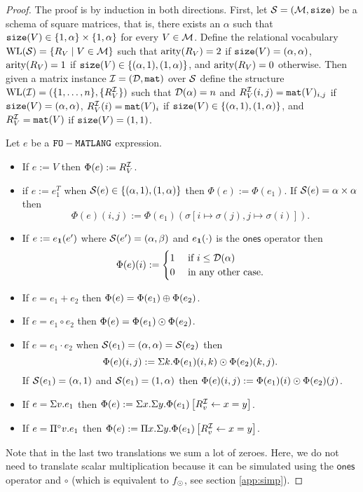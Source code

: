 \begin{proof}
The proof is by induction in both directions. 
First, let $\mathcal{S}=(\mathcal{M},\texttt{size})$ be a schema of square matrices, that is, there exists an $\alpha$ such 
that $\texttt{size}(V) \in \{1, \alpha\} \times \{1,\alpha\}$ for every $V \in \mathcal{M}$.
Define the relational vocabulary $\text{WL}(\mathcal{S}) = \{R_V \mid V \in \mathcal{M}\}$ such that $\operatorname{arity}(R_V) = 2$ 
if $\texttt{size}(V) = (\alpha, \alpha)$, $\operatorname{arity}(R_V) = 1$ if $\texttt{size}(V) \in \{(\alpha,1), (1,\alpha)\}$, and 
$\operatorname{arity}(R_V) = 0$ otherwise.
Then given a matrix instance $\mathcal{I} = (\mathcal{D},\texttt{mat})$ over $\mathcal{S}$ define the structure 
$\text{WL}(\mathcal{I}) = (\{1, \ldots, n\}, \{R_V^{\mathcal{I}}\} )$ such that $\mathcal{D}(\alpha) = n$ and 
$R_V^{\mathcal{I}}(i, j) = \texttt{mat}(V)_{i,j}$ if $\texttt{size}(V) = (\alpha, \alpha)$, $R_V^{\mathcal{I}}(i) = \texttt{mat}(V)_{i}$ 
if $\texttt{size}(V) \in \{(\alpha,1), (1,\alpha)\}$, and $R_V^{\mathcal{I}} = \texttt{mat}(V)$ if $\texttt{size}(V) = (1,1)$.

Let $e$ be a $\texttt{FO}-\texttt{MATLANG}$ expression.
\begin{itemize}
  \item If $e:=V$ then $\Phi(e):=R_V^{\mathcal{I}}$.
  \item if $e:= e_1^T$ when $\mathcal{S}(e)\in \{(\alpha,1), (1,\alpha)\}$ then $\Phi(e):=\Phi(e_1)$. If $\mathcal{S}(e)=\alpha\times\alpha$ then
  $$
  \Phi(e)(i,j):=\Phi(e_1)(\sigma\left[ i\mapsto \sigma(j), j\mapsto \sigma(i) \right]).
  $$
  \item If $e:=e_{\mathbf{1}}(e')$ where $\mathcal{S}(e')=(\alpha, \beta)$ and $e_{\mathbf{1}}(\cdot)$ is the $\mathsf{ones}$ operator 
  then
  \[
\Phi(e)(i) := \begin{cases}
1& \text{ if } i\leq\mathcal{D}(\alpha)\ \\
0 & \text{ in any other case.} 
\end{cases}
\]
  \item If $e=e_1+e_2$ then $\Phi(e)=\Phi(e_1)\oplus \Phi(e_2)$.
  \item If $e=e_1\circ e_2$ then $\Phi(e)=\Phi(e_1)\odot \Phi(e_2)$.
  \item If $e=e_1\cdot e_2$ when $\mathcal{S}(e_1)=(\alpha, \alpha)= \mathcal{S}(e_2)$ then 
  $$
  \Phi(e)(i,j):=\Sigma k. \Phi(e_1)(i,k)\odot\Phi(e_2)(k,j). 
  $$
  If $\mathcal{S}(e_1)=(\alpha, 1)$ and $\mathcal{S}(e_1)=(1, \alpha)$ then $\Phi(e)(i,j):=\Phi(e_1)(i)\odot\Phi(e_2)(j)$.
  \item If $e=\Sigma v. e_1$ then $\Phi(e):=\Sigma x.\Sigma y.\Phi(e_1)\left[ R_v^{\mathcal{I}}\gets x=y \right]$.
  \item If $e=\Pi^{\circ} v. e_1$ then $\Phi(e):=\Pi x.\Sigma y.\Phi(e_1)\left[ R_v^{\mathcal{I}}\gets x=y \right]$.
\end{itemize}
Note that in the last two translations we sum a lot of zeroes. Here, we do not need to translate scalar multiplication
because it can be simulated using the $\mathsf{ones}$ operator and $\circ$ (which is equivalent to $f_{\odot}$, see section \ref{app:simp}).


\end{proof}
